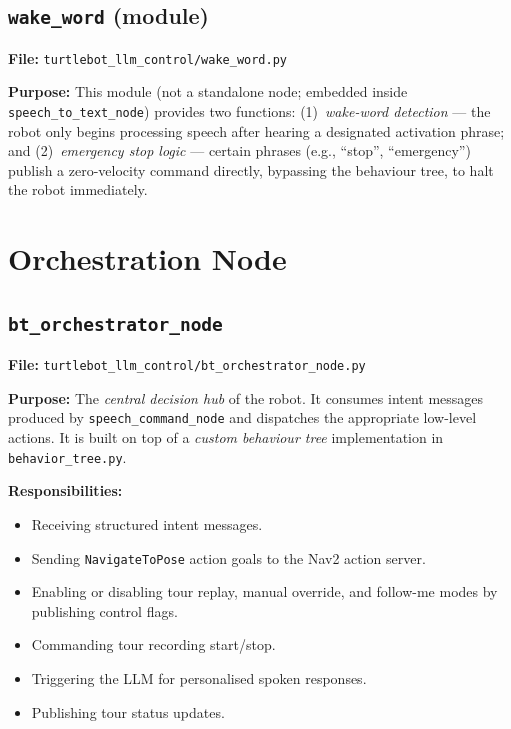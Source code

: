 \documentclass[12pt,a4paper]{report}
\newcommand{\file}[1]{\texttt{\color{black!70}#1}}
\newcommand{\node}[1]{\texttt{\color{Maroon}#1}}
\begin{document}
\subsection{\node{wake\_word} (module)}
\label{sub:wake}

\textbf{File:} \file{turtlebot\_llm\_control/wake\_word.py}

\textbf{Purpose:} This module (not a standalone node; embedded inside
\node{speech\_to\_text\_node}) provides two functions:
(1)~\emph{wake-word detection} — the robot only begins processing speech after
hearing a designated activation phrase; and (2)~\emph{emergency stop logic}
— certain phrases (e.g., ``stop'', ``emergency'') publish a zero-velocity
command directly, bypassing the behaviour tree, to halt the robot immediately.

\section{Orchestration Node}

\subsection{\node{bt\_orchestrator\_node}}
\label{sub:bt}

\textbf{File:} \file{turtlebot\_llm\_control/bt\_orchestrator\_node.py}

\textbf{Purpose:} The \emph{central decision hub} of the robot.  It consumes
intent messages produced by \node{speech\_command\_node} and dispatches the
appropriate low-level actions.  It is built on top of a \emph{custom behaviour
tree} implementation in \file{behavior\_tree.py}.

\textbf{Responsibilities:}
\begin{itemize}[leftmargin=2em]
  \item Receiving structured intent messages.
  \item Sending \texttt{NavigateToPose} action goals to the Nav2 action server.
  \item Enabling or disabling tour replay, manual override, and follow-me modes
        by publishing control flags.
  \item Commanding tour recording start/stop.
  \item Triggering the LLM for personalised spoken responses.
  \item Publishing tour status updates.
\end{itemize}
\end{document}
